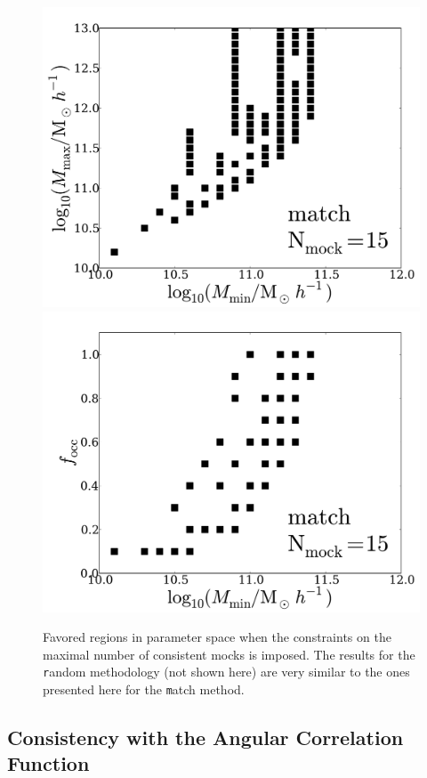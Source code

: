 \documentclass[usenatbib]{mn2e}
\begin{document}
\begin{figure}
\begin{center}
\includegraphics[width=0.46\linewidth,angle=0]{./plots/Fig5_match_mass_mock.pdf} 
\hspace{5mm}
\includegraphics[width=0.46\linewidth,angle=0]{./plots/Fig5_match_f_occ_mock.pdf}
\end{center}  
\caption{Favored regions in parameter space when the constraints on
  the maximal number of consistent mocks is imposed. The results for
  the {\texttt random} methodology (not shown here) are very similar to the ones
  presented here for the {\texttt match} method.
  \label{fig:restriction_mock}}  
\end{figure}



\subsection{Consistency with the Angular Correlation Function}
\end{document}
